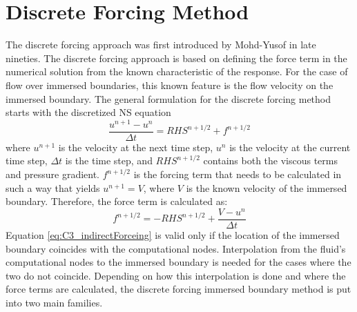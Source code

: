 \section{Discrete Forcing Method}
The discrete forcing approach was first introduced by Mohd-Yusof \cite{mohd1997combined} in late nineties. The discrete forcing approach is based on defining the force term in the numerical solution from the known characteristic of the response. For the case of flow over immersed boundaries, this known feature is the flow velocity on the immersed boundary. The general formulation for the discrete forcing method starts with the discretized NS equation
%
\begin{equation}\label{eq:C3_discreteNSforIndirectForcing}
    \frac{u^{n+1} - u^n}{\Delta t} = RHS^{n+1/2} + f^{n+1/2}
\end{equation}
%
where $u^{n+1}$ is the velocity at the next time step, $u^n$ is the velocity at the current time step, $\Delta t$ is the time step, and $RHS^{n+1/2}$ contains both the viscous terms and pressure gradient. $f^{n+1/2}$ is the forcing term that needs to be calculated in such a way that yields $u^{n+1} = V$, where $V$ is the known velocity of the immersed boundary. Therefore, the force term is calculated as:
%
\begin{equation}\label{eq:C3_indirectForceing}
    f^{n+1/2} = -RHS^{n+1/2} + \frac{V - u^n}{\Delta t}
\end{equation}
%
Equation \eqref{eq:C3_indirectForceing} is valid only if the location of the immersed boundary coincides with the computational nodes. Interpolation from the fluid's computational nodes to the immersed boundary is needed for the cases where the two do not coincide. Depending on how this interpolation is done and where the force terms are calculated, the discrete forcing immersed boundary method is put into two main families.
